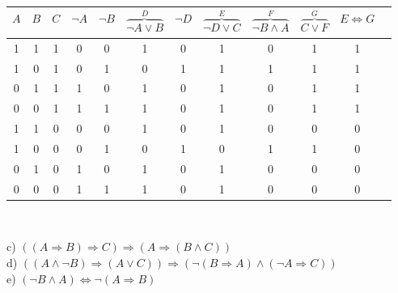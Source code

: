 \begin{table}[h]
\centering
\begin{tabular}{c|c|c|c|c|c|c|c|c|c|c|c}
$A$ & $B$ & $C$ & $\lnot A$ & $\lnot B$ & $\overbrace{\lnot A \lor B}^{D}$ & $\lnot D$ & $\overbrace{\lnot D \lor C}^{E}$ & $\overbrace{\lnot B \land A}^{F}$ & $\overbrace{C \lor F}^{G}$ & $E \Leftrightarrow G$\\
\hline
1 & 1 & 1 & 0 & 0 & 1 & 0 & 1 & 0 & 1 & 1\\
1 & 0 & 1 & 0 & 1 & 0 & 1 & 1 & 1 & 1 & 1\\
0 & 1 & 1 & 1 & 0 & 1 & 0 & 1 & 0 & 1 & 1\\
0 & 0 & 1 & 1 & 1 & 1 & 0 & 1 & 0 & 1 & 1\\
1 & 1 & 0 & 0 & 0 & 1 & 0 & 1 & 0 & 0 & 0\\
1 & 0 & 0 & 0 & 1 & 0 & 1 & 0 & 1 & 1 & 0\\
0 & 1 & 0 & 1 & 0 & 1 & 0 & 1 & 0 & 0 & 0\\
0 & 0 & 0 & 1 & 1 & 1 & 0 & 1 & 0 & 0 & 0\\
\end{tabular}
\end{table}\


c) $((A \Rightarrow B) \Rightarrow C) \Rightarrow (A \Rightarrow (B \land C))$\\

d) $((A \land \lnot B) \Rightarrow (A \lor C)) \Rightarrow (\lnot (B \Rightarrow A) \land (\lnot A \Rightarrow C))$\\

e) $(\lnot B \land A) \Leftrightarrow \lnot (A \Rightarrow B)$\\